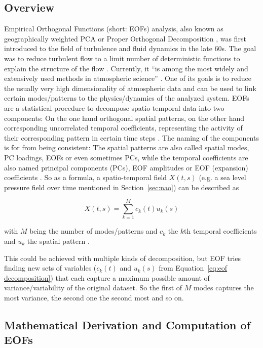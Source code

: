 \subsection{Overview}

Empirical Orthogonal Functions (short: EOFs) analysis, also known as geographically weighted PCA or Proper Orthogonal Decomposition \cite{vietinghoffdiss}, was first introduced to the field of turbulence and fluid dynamics in the late 60s. The goal was to reduce turbulent flow to a limit number of deterministic functions to explain the structure of the flow \cite{weiss_tutorial_2019}. Currently, it \enquote{is among the most widely and extensively used methods in atmospheric science} \cite{hannachi_empirical_2007}. 
One of its goals is to reduce the usually very high dimensionality of atmospheric data and can be used to link certain modes/patterns to the physics/dynamics of the analyzed system.  
EOFs are a statistical procedure to decompose spatio-temporal data into two components: On the one hand orthogonal spatial patterns, on the other hand corresponding uncorrelated temporal coefficients, representing the activity of their corresponding pattern in certain time steps \cite{hannachi_empirical_2007, vietinghoffdiss}. 
The naming of the components is for from being consistent: The spatial patterns are also called spatial modes, PC loadings, EOFs or even sometimes PCs, while the temporal coefficients are also named principal components (PCs), EOF amplitudes or EOF (expansion) coefficients \cite{hannachi_empirical_2007}. 
So as a formula, a spatio-temporal field $X(t, s)$ (e.g. a sea level pressure field over time mentioned in Section~\ref{sec:nao}) can be described as

\begin{equation}
  X(t, s) = \sum^{M}_{k=1} c_k(t) u_k(s)
  \label{eq:eof decomposition}
\end{equation}

with $M$ being the number of modes/patterns and  $c_k$ the $k$th temporal coefficients and $u_k$ the spatial pattern \cite{hannachi_empirical_2007}. 

This could be achieved with multiple kinds of decomposition, but EOF tries finding new sets of variables ($c_k(t)$ and $u_k(s)$ from Equation~\ref{eq:eof decomposition}) that each capture a maximum possible amount of variance/variability of the original dataset. 
So the first of $M$ modes captures the most variance, the second one the second most and so on. 

\subsection{Mathematical Derivation and Computation of EOFs}

